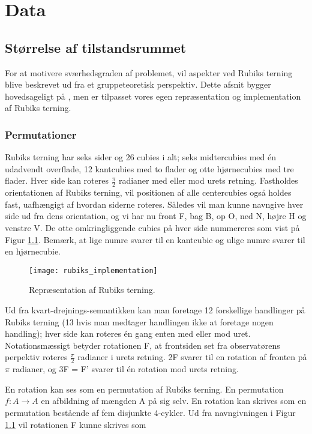 \documentclass[../main.tex]{subfiles}
\begin{document}
\chapter{Data}
\section{Størrelse af tilstandsrummet}
For at motivere sværhedsgraden af problemet, vil aspekter ved Rubiks terning blive beskrevet ud fra et gruppeteoretisk perspektiv. Dette afsnit bygger hovedsageligt på \cite{GroupTheory}, men er tilpasset vores egen repræsentation og implementation af Rubiks terning. 
\subsection{Permutationer}

Rubiks terning har seks sider og 26 cubies i alt; seks midtercubies med én udadvendt overflade, 12 kantcubies med to flader og otte hjørnecubies med tre flader. Hver side kan roteres $\frac{\pi}{2}$ radianer med eller mod urets retning. Fastholdes orientationen af Rubiks terning, vil positionen af alle centercubies også holdes fast, uafhængigt af hvordan siderne roteres. Således vil man kunne navngive hver side ud fra dens orientation, og vi har nu front F, bag B, op O, ned N, højre H og venstre V. De otte omkringliggende cubies på hver side nummereres som vist på Figur \ref{RubiksImplementation}. Bemærk, at lige numre svarer til en kantcubie og ulige numre svarer til en hjørnecubie.

\begin{figure}[H]
	\centering 
	\texttt{[image: rubiks\_implementation]}
	\caption{Repræsentation af Rubiks terning.}
	\label{RubiksImplementation}
\end{figure}

Ud fra kvart-drejnings-semantikken kan man foretage 12 forskellige handlinger på Rubiks terning (13 hvis man medtager handlingen ikke at foretage nogen handling); hver side kan roteres én gang enten med eller mod uret. Notationsmæssigt betyder rotationen F, at frontsiden set fra observatørens perpektiv roteres $\frac{\pi}{2}$ radianer i urets retning. 2F svarer til en rotation af fronten på $\pi$ radianer, og 3F = F' svarer til én rotation mod urets retning. 

En rotation kan ses som en permutation af Rubiks terning. En permutation $f:A\rightarrow A$ en afbildning af mængden A på sig selv. En rotation kan skrives som en permutation bestående af fem disjunkte 4-cykler. Ud fra navngivningen i Figur \ref{RubiksImplementation} vil rotationen F kunne skrives som
\end{document}
